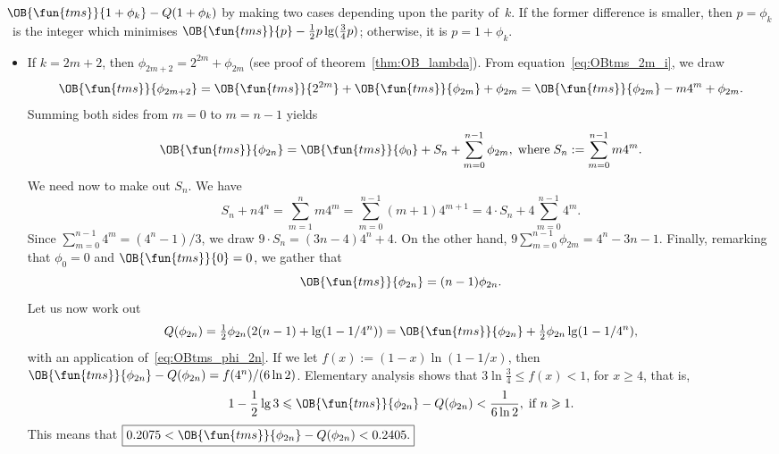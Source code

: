 \(\OB{\fun{tms}}{1+\phi_k} - Q(1+\phi_k)\) by making two cases
depending upon the parity of~\(k\). If the former difference is
smaller, then \(p=\phi_k\)~is the integer which minimises
\(\OB{\fun{tms}}{p} - \tfrac{1}{2}p\lg(\tfrac{3}{4}p)\); otherwise, it
is \(p=1+\phi_k\).
\begin{itemize}

  \item If \(k=2m+2\), then \(\phi_{2m+2} = 2^{2m} + \phi_{2m}\) (see
    proof of theorem~\ref{thm:OB_lambda}). From
    equation~\eqref{eq:OBtms_2m_i}, we draw
    \begin{equation*}
      \OB{\fun{tms}}{\phi_{2m+2}} = \OB{\fun{tms}}{2^{2m}} +
    \OB{\fun{tms}}{\phi_{2m}} + \phi_{2m} = \OB{\fun{tms}}{\phi_{2m}}
    - m4^m + \phi_{2m}.
    \end{equation*}
    Summing both sides from \(m=0\) to \(m=n-1\) yields
    \begin{equation*}
      \OB{\fun{tms}}{\phi_{2n}} = \OB{\fun{tms}}{\phi_0} + S_n
    + \sum_{m=0}^{n-1}{\phi_{2m}},\; \text{where}\; S_n :=
    \sum_{m=0}^{n-1}{m4^m}.
    \end{equation*}
    We need now to make out \(S_n\). We have
    \begin{equation*}
      S_n + n4^n = \sum_{m=1}^{n}{m4^m}
                 = \sum_{m=0}^{n-1}(m+1)4^{m+1}
                 = 4 \cdot S_n + 4\sum_{m=0}^{n-1}4^m.
    \end{equation*}
    Since \(\sum_{m=0}^{n-1}4^m = (4^n-1)/3\), we draw \(9 \cdot S_n =
    (3n -4)4^n + 4\). On the other hand, \(9
    \sum_{m=0}^{n-1}{\phi_{2m}} = 4^n - 3n - 1\). Finally, remarking
    that \(\phi_0 = 0\) and \(\OB{\fun{tms}}{0} = 0\), we gather that
    \begin{equation}
      \OB{\fun{tms}}{\phi_{2n}} = (n-1)\phi_{2n}.
    \label{eq:OBtms_phi_2n}
    \end{equation}
    Let us now work out
    \begin{equation*}
      Q(\phi_{2n}) = \tfrac{1}{2}\phi_{2n}(2(n-1)
    + \lg(1-1/4^n)) = \OB{\fun{tms}}{\phi_{2n}} +
    \tfrac{1}{2}\phi_{2n}\lg(1-1/4^n),
    \end{equation*}
    with an application of~\eqref{eq:OBtms_phi_2n}. If we let \(f(x) := (1-x)
    \ln(1-1/x)\), then \(\OB{\fun{tms}}{\phi_{2n}} - Q(\phi_{2n}) =
    f(4^n)/(6\ln 2)\). Elementary analysis shows that
    \(3\ln\tfrac{3}{4} \leqslant f(x) < 1\), for \(x \geqslant 4\),
    that is,
    \begin{equation*}
      1 - \frac{1}{2}\lg 3 \leqslant
    \OB{\fun{tms}}{\phi_{2n}} - Q(\phi_{2n}) < \frac{1}{6\ln 2},\; \text{if \(n
      \geqslant 1\)}.
    \end{equation*}
    This means that \(\boxed{0.2075 <
    \smash{\OB{\fun{tms}}{\phi_{2n}}} - Q(\phi_{2n}) < 0.2405.}\)


\end{itemize}

